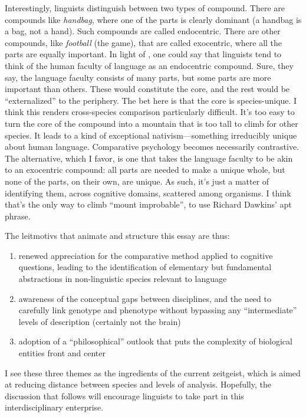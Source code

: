 Interestingly, linguists distinguish between two types of compound. There are compounds like \textit{handbag}, where one of the parts is clearly dominant (a handbag is a bag, not a hand). Such compounds are called endocentric. There are other compounds, like \textit{football} (the game), that are called exocentric, where all the parts are equally important. In light of \cite{hauser2002faculty}, one could say that linguists tend to think of the human faculty of language as an endocentric compound. Sure, they say, the language faculty consists of many parts, but some parts are more important than others. These would constitute the core, and the rest would be ``externalized'' to the periphery. The bet here is that the core is species-unique. I think this renders cross-species comparison particularly difficult. It's too easy to turn the core of the compound into a mountain that is too tall to climb for other species. It leads to a kind of exceptional nativism---something irreducibly unique about human language. Comparative psychology becomes necessarily contrastive. The alternative, which I favor, is one that takes the language faculty to be akin to an exocentric compound: all parts are needed to make a unique whole, but none of the parts, on their own, are unique. As such, it's just a matter of identifying them, across cognitive domains, scattered among organisms. I think that's the only way to climb ``mount improbable'', to use Richard Dawkins' apt phrase.

The leitmotivs that animate and structure this essay are thus: 
\begin{enumerate}
\renewcommand{\labelenumi}{(\roman{enumi})}
\item renewed appreciation for the comparative method applied to cognitive questions, leading to the identification of elementary but fundamental abstractions in non-linguistic species relevant to language
\item awareness of the conceptual gaps between disciplines, and the need to carefully link genotype and phenotype without bypassing any ``intermediate'' levels of description (certainly not the brain)
\item adoption of a ``philosophical'' outlook that puts the complexity of biological entities front and center
\end{enumerate}
I see these three themes as the ingredients of the current zeitgeist, which is aimed at reducing distance between species and levels of analysis. Hopefully, the discussion that follows will encourage linguists to take part in this interdisciplinary enterprise. 

